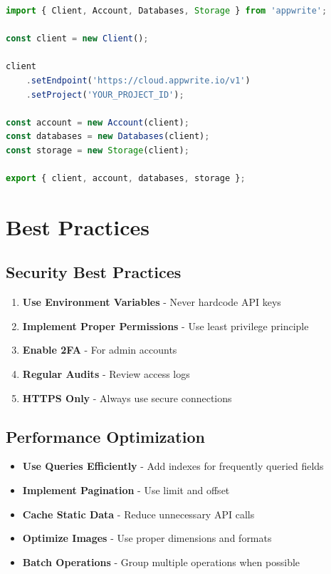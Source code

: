 \documentclass[11pt,a4paper,oneside]{book}
\begin{document}
\begin{lstlisting}[language=JavaScript, caption=Initialize Appwrite Client]
import { Client, Account, Databases, Storage } from 'appwrite';

const client = new Client();

client
    .setEndpoint('https://cloud.appwrite.io/v1')
    .setProject('YOUR_PROJECT_ID');

const account = new Account(client);
const databases = new Databases(client);
const storage = new Storage(client);

export { client, account, databases, storage };
\end{lstlisting}

\chapter{Best Practices}

\section{Security Best Practices}

\begin{enumerate}
    \item \textbf{Use Environment Variables} - Never hardcode API keys
    \item \textbf{Implement Proper Permissions} - Use least privilege principle
    \item \textbf{Enable 2FA} - For admin accounts
    \item \textbf{Regular Audits} - Review access logs
    \item \textbf{HTTPS Only} - Always use secure connections
\end{enumerate}

\section{Performance Optimization}

\begin{itemize}
    \item \textbf{Use Queries Efficiently} - Add indexes for frequently queried fields
    \item \textbf{Implement Pagination} - Use limit and offset
    \item \textbf{Cache Static Data} - Reduce unnecessary API calls
    \item \textbf{Optimize Images} - Use proper dimensions and formats
    \item \textbf{Batch Operations} - Group multiple operations when possible
\end{itemize}
\end{document}
